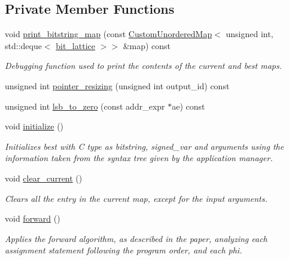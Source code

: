 \subsection*{Private Member Functions}
\begin{DoxyCompactItemize}
\item 
void \hyperlink{classBit__Value_a680cd4a8faa401adb3262c2cfd8fc06f}{print\+\_\+bitstring\+\_\+map} (const \hyperlink{custom__map_8hpp_ad1ed68f2ff093683ab1a33522b144adc}{Custom\+Unordered\+Map}$<$ unsigned int, std\+::deque$<$ \hyperlink{bit__lattice_8hpp_ab732360111c810c4eaeb4c8b81d160d6}{bit\+\_\+lattice} $>$$>$ \&map) const
\begin{DoxyCompactList}\small\item\em Debugging function used to print the contents of the current and best maps. \end{DoxyCompactList}\item 
unsigned int \hyperlink{classBit__Value_a91a36b568a7e9ddf21b7069ee4ecc518}{pointer\+\_\+resizing} (unsigned int output\+\_\+id) const
\item 
unsigned int \hyperlink{classBit__Value_a71f649375c0d473c2f5b91ecc6c89365}{lsb\+\_\+to\+\_\+zero} (const addr\+\_\+expr $\ast$ae) const
\item 
void \hyperlink{classBit__Value_acb5ecbfd885e6478546792c4a446364c}{initialize} ()
\begin{DoxyCompactList}\small\item\em Initializes best with C type as bitstring, signed\+\_\+var and arguments using the information taken from the syntax tree given by the application manager. \end{DoxyCompactList}\item 
void \hyperlink{classBit__Value_a03e2a690b6edfac4100e93554c43629c}{clear\+\_\+current} ()
\begin{DoxyCompactList}\small\item\em Clears all the entry in the current map, except for the input arguments. \end{DoxyCompactList}\item 
void \hyperlink{classBit__Value_ade90e85e32dd5a1c2c4d11c221a69fd2}{forward} ()
\begin{DoxyCompactList}\small\item\em Applies the forward algorithm, as described in the paper, analyzing each assignment statement following the program order, and each phi. \end{DoxyCompactList}\item 
$$
\end{DoxyCompactItemize}
